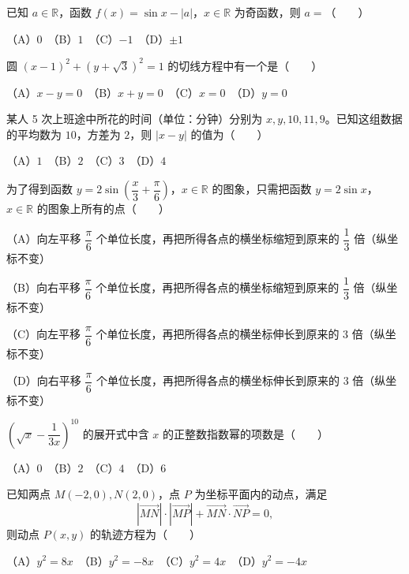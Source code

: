 \begin{question}
已知 $a\in\mathbb R$，函数 $f(x)=\sin x-|a|$，$x\in\mathbb R$ 为奇函数，则 $a=$\mbox{（　　）}

（A）$0$　（B）$1$　（C）$-1$　（D）$\pm1$

\end{question}
\begin{question}
圆 $(x-1)^2+(y+\sqrt3)^2=1$ 的切线方程中有一个是\mbox{（　　）}

（A）$x-y=0$　（B）$x+y=0$　（C）$x=0$　（D）$y=0$

\end{question}
\begin{question}
某人 5 次上班途中所花的时间（单位：分钟）分别为 $x,y,10,11,9$。已知这组数据的平均数为 $10$，方差为 $2$，则 $|x-y|$ 的值为\mbox{（　　）}

（A）$1$　（B）$2$　（C）$3$　（D）$4$

\end{question}
\begin{question}
为了得到函数 $y=2\sin\left(\dfrac{x}{3}+\dfrac{\pi}{6}\right)$，$x\in\mathbb R$ 的图象，只需把函数 $y=2\sin x$，$x\in\mathbb R$ 的图象上所有的点\mbox{（　　）}

（A）向左平移 $\dfrac{\pi}{6}$ 个单位长度，再把所得各点的横坐标缩短到原来的 $\dfrac13$ 倍（纵坐标不变）

（B）向右平移 $\dfrac{\pi}{6}$ 个单位长度，再把所得各点的横坐标缩短到原来的 $\dfrac13$ 倍（纵坐标不变）

（C）向左平移 $\dfrac{\pi}{6}$ 个单位长度，再把所得各点的横坐标伸长到原来的 $3$ 倍（纵坐标不变）

（D）向右平移 $\dfrac{\pi}{6}$ 个单位长度，再把所得各点的横坐标伸长到原来的 $3$ 倍（纵坐标不变）

\end{question}
\begin{question}
$\left(\sqrt{x}-\dfrac{1}{3x}\right)^{10}$ 的展开式中含 $x$ 的正整数指数幂的项数是\mbox{（　　）}

（A）$0$　（B）$2$　（C）$4$　（D）$6$

\end{question}
\begin{question}
已知两点 $M(-2,0),N(2,0)$，点 $P$ 为坐标平面内的动点，满足
\nopagebreak[4]
\[\left|\overrightarrow{MN}\right|\cdot\left|\overrightarrow{MP}\right|+\overrightarrow{MN}\cdot\overrightarrow{NP}=0,\]
则动点 $P(x,y)$ 的轨迹方程为\mbox{（　　）}

（A）$y^2=8x$　（B）$y^2=-8x$　（C）$y^2=4x$　（D）$y^2=-4x$

\end{question}
